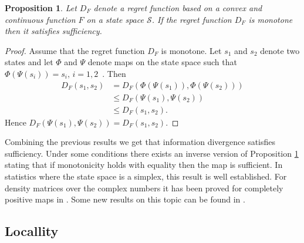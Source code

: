 \documentclass[10pt,a4paper,draft]{article}
\newtheorem{Prop}{Proposition}
\begin{document}
\begin{Prop}
\label{prop:sufficiency}Let $D_F$ denote a regret function based on a convex and continuous function $F$ on a state space ${\mathcal S}$. If the regret function $D_{F}$ is monotone then it satisfies sufficiency.
\end{Prop}
\begin{proof}
Assume that the regret function $D_{F}$ is monotone. Let $s_{1}$ and $s_{2}$ denote two states and let $\Phi$ and $\Psi$ denote maps on the state space such that
$\Phi\left(\Psi\left(s_{i}\right)\right)=s_{i},\,i=1,2$~.
Then 
\begin{align*}
D_{F}\left(s_{1},s_{2}\right) &
=D_{F}\left(\Phi\left(\Psi\left(s_{1}\right)\right),\Phi\left(\Psi\left(s_{2}\right)\right)\right)\\
& \leq
D_{F}\left(\Psi\left(s_{1}\right),\Psi\left(s_{2}\right)\right)\\
 & \leq D_{F}\left(s_{1},s_{2}\right).
\end{align*}
Hence
$D_{F}\left(\Psi\left(s_{1}\right),\Psi\left(s_{2}\right)\right)=D_{F}\left(s_{1},s_{2}\right).$
\end{proof}
Combining the previous results we get that information
divergence satisfies sufficiency. Under some conditions
there exists an inverse version of Proposition
\ref{prop:sufficiency}
stating that if monotonicity holds with equality then the
map is sufficient. In statistics where the state space is a simplex,
this result is well established. For density matrices over the
complex numbers it has been proved for completely positive maps in
\cite{Jencova2006}. Some new results on this topic can be found in
\cite{Jencova2017}.

\subsection{Locallity}
\end{document}
